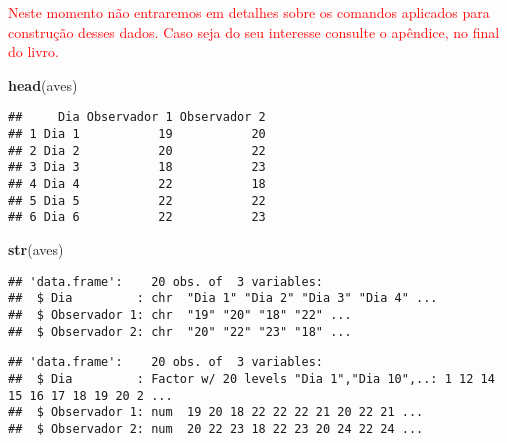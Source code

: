 \documentclass[titlepage, oneside, openany, a4paper]{book}
\newenvironment{Shaded}{\begin{snugshade}}{\end{snugshade}}
\newcommand{\DataTypeTok}[1]{\textcolor[rgb]{0.13,0.29,0.53}{#1}}
\newcommand{\KeywordTok}[1]{\textcolor[rgb]{0.13,0.29,0.53}{\textbf{#1}}}
\newcommand{\NormalTok}[1]{#1}
\newcommand{\OperatorTok}[1]{\textcolor[rgb]{0.81,0.36,0.00}{\textbf{#1}}}
\newcommand{\StringTok}[1]{\textcolor[rgb]{0.31,0.60,0.02}{#1}}
\begin{document}
\textcolor{red}{Neste momento não entraremos em detalhes sobre os comandos aplicados para construção desses dados. Caso seja do seu interesse consulte o apêndice, no final do livro.}

\begin{Shaded}
\begin{Highlighting}[]
\KeywordTok{head}\NormalTok{(aves)}
\end{Highlighting}
\end{Shaded}

\begin{verbatim}
##     Dia Observador 1 Observador 2
## 1 Dia 1           19           20
## 2 Dia 2           20           22
## 3 Dia 3           18           23
## 4 Dia 4           22           18
## 5 Dia 5           22           22
## 6 Dia 6           22           23
\end{verbatim}

\begin{Shaded}
\begin{Highlighting}[]
\KeywordTok{str}\NormalTok{(aves)}
\end{Highlighting}
\end{Shaded}

\begin{verbatim}
## 'data.frame':    20 obs. of  3 variables:
##  $ Dia         : chr  "Dia 1" "Dia 2" "Dia 3" "Dia 4" ...
##  $ Observador 1: chr  "19" "20" "18" "22" ...
##  $ Observador 2: chr  "20" "22" "23" "18" ...
\end{verbatim}

\begin{Shaded}
\end{Shaded}

\begin{verbatim}
## 'data.frame':    20 obs. of  3 variables:
##  $ Dia         : Factor w/ 20 levels "Dia 1","Dia 10",..: 1 12 14 15 16 17 18 19 20 2 ...
##  $ Observador 1: num  19 20 18 22 22 22 21 20 22 21 ...
##  $ Observador 2: num  20 22 23 18 22 23 20 24 22 24 ...
\end{verbatim}
\end{document}
